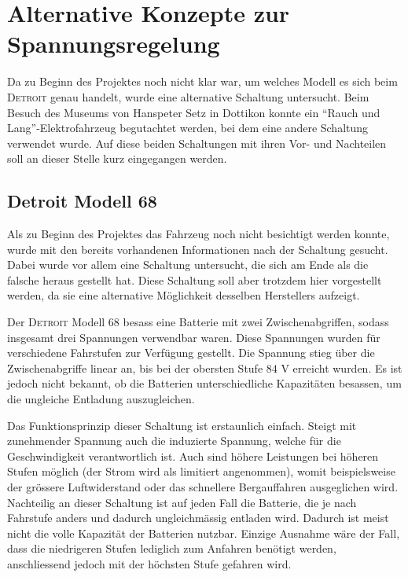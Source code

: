 \section{Alternative Konzepte zur Spannungsregelung}
Da zu Beginn des Projektes noch nicht klar war, um welches Modell es sich beim \textsc{Detroit} genau handelt, wurde eine alternative Schaltung untersucht. Beim Besuch des Museums von Hanspeter Setz in Dottikon konnte ein "`Rauch und Lang"'-Elektrofahrzeug begutachtet werden, bei dem eine andere Schaltung verwendet wurde. Auf diese beiden Schaltungen mit ihren Vor- und Nachteilen soll an dieser Stelle kurz eingegangen werden.

\subsection{Detroit Modell 68}
Als zu Beginn des Projektes das Fahrzeug noch nicht besichtigt werden konnte, wurde mit den bereits vorhandenen Informationen nach der Schaltung gesucht. Dabei wurde vor allem eine Schaltung untersucht, die sich am Ende als die falsche heraus gestellt hat. Diese Schaltung soll aber trotzdem hier vorgestellt werden, da sie eine alternative Möglichkeit desselben Herstellers aufzeigt.

\newpage

Der \textsc{Detroit} Modell 68 besass eine Batterie mit zwei Zwischenabgriffen, sodass insgesamt drei Spannungen verwendbar waren. Diese Spannungen wurden für verschiedene Fahrstufen zur Verfügung gestellt. Die Spannung stieg über die Zwischenabgriffe linear an, bis bei der obersten Stufe $84$ V erreicht wurden. Es ist jedoch nicht bekannt, ob die Batterien unterschiedliche Kapazitäten besassen, um die ungleiche Entladung auszugleichen.

Das Funktionsprinzip dieser Schaltung ist erstaunlich einfach. Steigt mit zunehmender Spannung auch die induzierte Spannung, welche für die Geschwindigkeit verantwortlich ist. Auch sind höhere Leistungen bei höheren Stufen möglich (der Strom wird als limitiert angenommen), womit beispielsweise der grössere Luftwiderstand oder das schnellere Bergauffahren ausgeglichen wird. Nachteilig an dieser Schaltung ist auf jeden Fall die Batterie, die je nach Fahrstufe anders und dadurch ungleichmässig entladen wird. Dadurch ist meist nicht die volle Kapazität der Batterien nutzbar. Einzige Ausnahme wäre der Fall, dass die niedrigeren Stufen lediglich zum Anfahren benötigt werden, anschliessend jedoch mit der höchsten Stufe gefahren wird.


